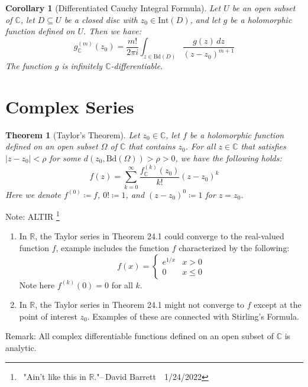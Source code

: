\documentclass[15pt]{book}
\theoremstyle{break}
\theoremstyle{break}
\newtheorem{thm}{Theorem}[section]
\newtheorem{corT}[lem]{Corollary}
\newcommand{\R}{\mathbb{R}}
\newcommand{\Int}{\text{Int}}
\newcommand{\Bd}{\text{Bd}}
\newcommand{\Complex}{\mathbb{C}}
\newcommand{\note}{\color{red}Note: \color{black}}
\newcommand{\remark}{\color{blue}Remark: \color{black}}
\begin{document}
\begin{corT}[Differentiated Cauchy Integral Formula]
Let $U$ be an open subset of $\Complex$, let $D\subseteq U$ be a closed disc with $z_0 \in \Int(D)$, and let $g$ be a holomorphic function defined on $U$. Then we have:
$$g^{(m)}_{\Complex}(z_0) = \frac{m!}{2\pi i}\int_{z\in \Bd(D)}\frac{g(z)\, dz}{(z-z_0)^{m+1}}$$
The function $g$ is infinitely $\Complex$-differentiable.
\end{corT}

\newpage
\section[Complex Series]{\color{red} Complex Series \color{black}}
\begin{thm}[Taylor's Theorem]
Let $z_0 \in \Complex$, let $f$ be a holomorphic function defined on an open subset $\Omega$ of $\Complex$ that contains $z_0$. For all $z \in \Complex$ that satisfies $|z-z_0|<\rho$ for some $d(z_0, \Bd(\Omega))>\rho >0$, we have the following holds:
$$f(z) = \sum_{k=0}^\infty \frac{f^{(k)}_{\Complex}(z_0)}{k!}(z-z_0)^k$$
Here we denote $f^{(0)} \coloneqq f$, $0!\coloneqq 1$, and $(z-z_0)^0 \coloneqq 1$ for $z= z_0$. 
\end{thm}

\note ALTIR \footnote{\ "Ain't like this in $\R$."\hfill --\,David Barrett\ \ 1/24/2022}
\begin{enumerate}[topsep=3pt,itemsep=-1ex,partopsep=1ex,parsep=1ex]
\item In $\R$, the Taylor series in Theorem 24.1 could converge to the real-valued function $f$, example includes the function $f$ characterized by the following: $$f(x) = \begin{cases}e^{1/x} & x>0 \\ 0 & x\leq 0 \end{cases}$$ Note here $f^{(k)}(0) = 0$ for all $k$.
\item In $\R$, the Taylor series in Theorem 24.1 might not converge to $f$ except at the point of interest $z_0$.
Examples of these are connected with Stirling's Formula.  
\end{enumerate}
\remark All complex differentiable functions defined on an open subset of $\Complex$ is analytic.
\end{document}
